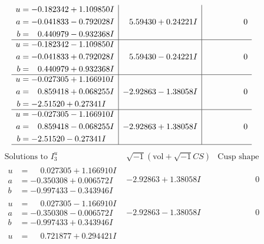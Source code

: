 \documentclass[1p]{elsarticle_modified}
\theoremstyle{definition}
\newcommand{\I}{\sqrt{-1}}
\begin{document}
$$\begin{array}{c|c|c}
\begin{aligned}
u &= -0.182342 + 1.109850 I \\
a &= -0.041833 - 0.792028 I \\
b &= \phantom{-}0.440979 - 0.932368 I\end{aligned}
 & \phantom{-}5.59430 + 0.24221 I & \phantom{-0.000000 } 0 \\ \hline\begin{aligned}
u &= -0.182342 - 1.109850 I \\
a &= -0.041833 + 0.792028 I \\
b &= \phantom{-}0.440979 + 0.932368 I\end{aligned}
 & \phantom{-}5.59430 - 0.24221 I & \phantom{-0.000000 } 0 \\ \hline\begin{aligned}
u &= -0.027305 + 1.166910 I \\
a &= \phantom{-}0.859418 + 0.068255 I \\
b &= -2.51520 + 0.27341 I\end{aligned}
 & -2.92863 - 1.38058 I & \phantom{-0.000000 } 0 \\ \hline\begin{aligned}
u &= -0.027305 - 1.166910 I \\
a &= \phantom{-}0.859418 - 0.068255 I \\
b &= -2.51520 - 0.27341 I\end{aligned}
 & -2.92863 + 1.38058 I & \phantom{-0.000000 } 0\\
 \hline 
 \end{array}$$\newpage$$\begin{array}{c|c|c}  
\text{Solutions to }I^u_{3}& \I (\text{vol} + \sqrt{-1}CS) & \text{Cusp shape}\\
 \hline 
\begin{aligned}
u &= \phantom{-}0.027305 + 1.166910 I \\
a &= -0.350308 + 0.006572 I \\
b &= -0.997433 - 0.343946 I\end{aligned}
 & -2.92863 + 1.38058 I & \phantom{-0.000000 } 0 \\ \hline\begin{aligned}
u &= \phantom{-}0.027305 - 1.166910 I \\
a &= -0.350308 - 0.006572 I \\
b &= -0.997433 + 0.343946 I\end{aligned}
 & -2.92863 - 1.38058 I & \phantom{-0.000000 } 0 \\ \hline\begin{aligned}
u &= \phantom{-}0.721877 + 0.294421 I \\

\end{aligned}
\end{array}$$
\end{document}
